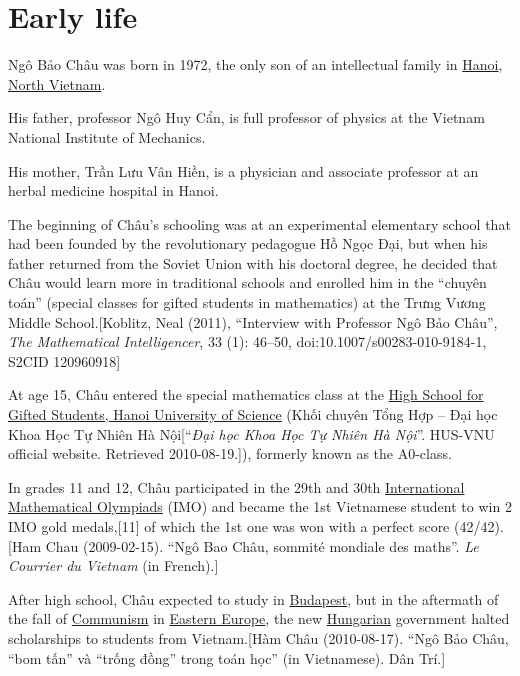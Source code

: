 \documentclass{book}
\numberwithin{equation}{section}
\begin{document}
\section{Early life}
Ngô Bảo Châu was born in 1972, the only son of an intellectual family in \href{https://en.wikipedia.org/wiki/Hanoi}{Hanoi}, \href{https://en.wikipedia.org/wiki/North_Vietnam}{North Vietnam}.

His father, professor Ngô Huy Cẩn, is full professor of physics at the Vietnam National Institute of Mechanics.

His mother, Trần Lưu Vân Hiền, is a physician and associate professor at an herbal medicine hospital in Hanoi.

%
The beginning of Châu's schooling was at an experimental elementary school that had been founded by the revolutionary pedagogue Hồ Ngọc Đại, but when his father returned from the Soviet Union with his doctoral degree, he decided that Châu would learn more in traditional schools and enrolled him in the ``chuyên toán'' (special classes for gifted students in mathematics) at the Trưng Vương Middle School.[Koblitz, Neal (2011), ``Interview with Professor Ngô Bảo Châu'', \textit{The Mathematical Intelligencer}, 33 (1): 46--50, doi:10.1007/s00283-010-9184-1, S2CID 120960918]

At age 15, Châu entered the special mathematics class at the \href{https://en.wikipedia.org/wiki/High_School_for_Gifted_Students,_Hanoi_University_of_Science}{High School for Gifted Students, Hanoi University of Science} (Khối chuyên Tổng Hợp -- Đại học Khoa Học Tự Nhiên Hà Nội[``\textit{Đại học Khoa Học Tự Nhiên Hà Nội}''. HUS-VNU official website. Retrieved 2010-08-19.]), formerly known as the A0-class.

In grades 11 and 12, Châu participated in the 29th and 30th \href{https://en.wikipedia.org/wiki/International_Mathematical_Olympiad}{International Mathematical Olympiads} (IMO) and became the 1st Vietnamese student to win 2 IMO gold medals,[11] of which the 1st one was won with a perfect score (42/42).[Ham Chau (2009-02-15). ``Ngô Bao Châu, sommité mondiale des maths''. \textit{Le Courrier du Vietnam} (in French).]

%
After high school, Châu expected to study in \href{https://en.wikipedia.org/wiki/Budapest}{Budapest}, but in the aftermath of the fall of \href{https://en.wikipedia.org/wiki/Communism}{Communism} in \href{https://en.wikipedia.org/wiki/Eastern_Europe}{Eastern Europe}, the new \href{https://en.wikipedia.org/wiki/Hungary}{Hungarian} government halted scholarships to students from Vietnam.[Hàm Châu (2010-08-17). ``Ngô Bảo Châu, ``bom tấn'' và ``trống đồng'' trong toán học'' (in Vietnamese). Dân Trí.]
\end{document}
